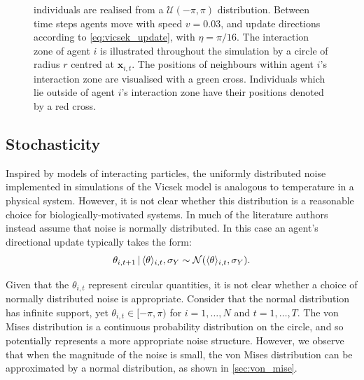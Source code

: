 \begin{figure}[tb]
{    individuals are realised from a $\mathcal{U}(-\pi, \pi)$ distribution.
    Between time steps agents move with speed $v=0.03$, and update
    directions according to \cref{eq:vicsek_update}, with $\eta=\pi/16$.
    The interaction zone of agent $i$ is illustrated throughout the
    simulation by a circle of radius $r$ centred at $\bm{x}_{i,t}$. The
    positions of neighbours within agent $i$'s interaction zone are
    visualised with a green cross. Individuals which lie outside of agent
    $i$'s interaction zone have their positions denoted by a red cross.}
  \label{fig:vicsek_illustration}
\end{figure}

\subsection{Stochasticity}

Inspired by models of interacting particles, the uniformly distributed noise
implemented in simulations of the Vicsek model is analogous to temperature in a
physical system. However, it is not clear whether this distribution is a
reasonable choice for biologically-motivated systems. In much of the literature
authors instead assume that noise is normally distributed. In this case an
agent's directional update typically takes the form:
\begin{equation*}
  \label{eq:normal_update}
  \theta_{i,t+1} \,|\, \langle\theta\rangle_{i,t}, \sigma_Y \sim
      \mathcal{N}(\langle\theta\rangle_{i,t}, \sigma_Y).
\end{equation*}

Given that the $\theta_{i,t}$ represent circular quantities, it is not clear
whether a choice of normally distributed noise is appropriate. Consider that
the normal distribution has infinite support, yet $\theta_{i,t}\in[-\pi,\pi)$
for $i=1,\ldots,N$ and $t=1,\ldots,T$. The von Mises distribution is a
continuous probability distribution on the circle, and so potentially
represents a more appropriate noise structure. However, we observe that when
the magnitude of the noise is small, the von Mises distribution can be
approximated by a normal distribution, as shown in \cref{sec:von_mise}.

